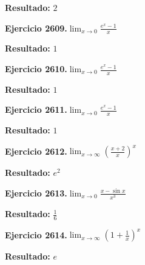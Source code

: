\documentclass[10pt,a4paper]{article}
\begin{document}
\begin{solbox}
\textbf{Resultado:} \(\displaystyle 2\)
\end{solbox}

\begin{ejbox}
\textbf{Ejercicio 2609.}\quad $\lim_{x\to 0} \frac{e^x-1}{x}$
\end{ejbox}

\begin{solbox}
\textbf{Resultado:} \(\displaystyle 1\)
\end{solbox}

\newpage
\begin{ejbox}
\textbf{Ejercicio 2610.}\quad $\lim_{x\to 0} \frac{e^x-1}{x}$
\end{ejbox}

\begin{solbox}
\textbf{Resultado:} \(\displaystyle 1\)
\end{solbox}

\begin{ejbox}
\textbf{Ejercicio 2611.}\quad $\lim_{x\to 0} \frac{e^x-1}{x}$
\end{ejbox}

\begin{solbox}
\textbf{Resultado:} \(\displaystyle 1\)
\end{solbox}

\begin{ejbox}
\textbf{Ejercicio 2612.}\quad $\lim_{x\to \infty} \left(\frac{x+2}{x}\right)^{x}$
\end{ejbox}

\begin{solbox}
\textbf{Resultado:} \(\displaystyle e^{2}\)
\end{solbox}

\newpage
\begin{ejbox}
\textbf{Ejercicio 2613.}\quad $\lim_{x\to 0} \frac{x-\sin x}{x^3}$
\end{ejbox}

\begin{solbox}
\textbf{Resultado:} \(\displaystyle \frac{1}{6}\)
\end{solbox}

\begin{ejbox}
\textbf{Ejercicio 2614.}\quad $\lim_{x\to \infty} \left(1+\frac{1}{x}\right)^x$
\end{ejbox}

\begin{solbox}
\textbf{Resultado:} \(\displaystyle e\)
\end{solbox}
\end{document}
